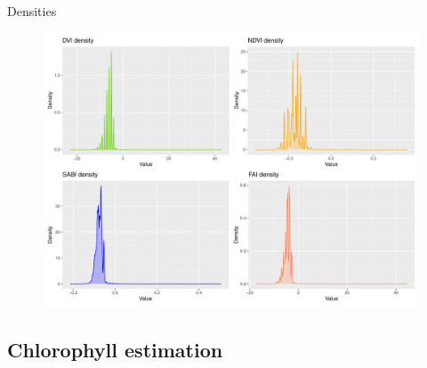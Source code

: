 \documentclass[10pt]{beamer}
\begin{document}
\begin{frame}{Densities}
\begin{figure}
    \centering
    \includegraphics[width=\textwidth]{images/density.pdf}
\end{figure}  
\end{frame}

\subsection{Chlorophyll estimation}
\end{document}

